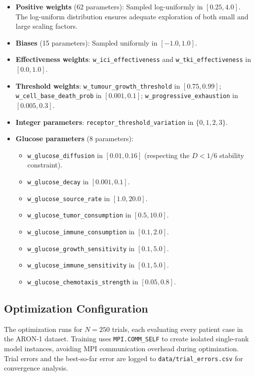 \begin{itemize}
    \item \textbf{Positive weights} (62 parameters): Sampled log-uniformly in $[0.25, 4.0]$. The log-uniform distribution ensures adequate exploration of both small and large scaling factors.
    \item \textbf{Biases} (15 parameters): Sampled uniformly in $[-1.0, 1.0]$.
    \item \textbf{Effectiveness weights}: \texttt{w\_ici\_effectiveness} and \texttt{w\_tki\_effectiveness} in $[0.0, 1.0]$.
    \item \textbf{Threshold weights}: \texttt{w\_tumour\_growth\_threshold} in $[0.75, 0.99]$; \texttt{w\_cell\_base\_death\_prob} in $[0.001, 0.1]$; \texttt{w\_progressive\_exhaustion} in $[0.005, 0.3]$.
    \item \textbf{Integer parameters}: \texttt{receptor\_threshold\_variation} in $\{0, 1, 2, 3\}$.
    \item \textbf{Glucose parameters} (8 parameters):
    \begin{itemize}
        \item \texttt{w\_glucose\_diffusion} in $[0.01, 0.16]$ (respecting the $D < 1/6$ stability constraint).
        \item \texttt{w\_glucose\_decay} in $[0.001, 0.1]$.
        \item \texttt{w\_glucose\_source\_rate} in $[1.0, 20.0]$.
        \item \texttt{w\_glucose\_tumor\_consumption} in $[0.5, 10.0]$.
        \item \texttt{w\_glucose\_immune\_consumption} in $[0.1, 2.0]$.
        \item \texttt{w\_glucose\_growth\_sensitivity} in $[0.1, 5.0]$.
        \item \texttt{w\_glucose\_immune\_sensitivity} in $[0.1, 5.0]$.
        \item \texttt{w\_glucose\_chemotaxis\_strength} in $[0.05, 0.8]$.
    \end{itemize}
\end{itemize}

\subsection{Optimization Configuration}

The optimization runs for $N = 250$ trials, each evaluating every patient case in the ARON-1 dataset. Training uses \texttt{MPI.COMM\_SELF} to create isolated single-rank model instances, avoiding MPI communication overhead during optimization. Trial errors and the best-so-far error are logged to \texttt{data/trial\_errors.csv} for convergence analysis.

